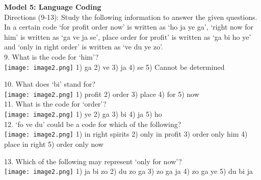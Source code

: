 \documentclass[
]{article}
\begin{document}
\textbf{Model 5: Language Coding}\\

Directions (9-13): Study the following information to answer the given questions.\\
In a certain code ‘for profit order now’ is written as ‘ho ja ye ga’, ‘right now for him’ is written as ‘ga ve ja se’, place order for profit’ is written as ‘ga bi ho ye’ and ‘only in right order’ is written as ‘ve du ye zo’.\\

9. What is the code for ‘him’?\\
\texttt{[image: image2.png]}
1) ga \hspace{2mm}2) ve \hspace{2mm}3) ja \hspace{2mm}4) se \hspace{2mm}5) Cannot be determined

10. What does ‘bi’ stand for?\\
\texttt{[image: image2.png]}
1) profit \hspace{2mm}2) order \hspace{2mm}3) place \hspace{2mm}4) for \hspace{2mm} 5) now\\

11. What is the code for ‘order’?\\
\texttt{[image: image2.png]}
1) ye \hspace{2mm}2) ga \hspace{2mm}3) bi \hspace{2mm}4) ja \hspace{2mm}5) ho\\

12. ‘fo ve du’ could be a code for which of the following?\\
\texttt{[image: image2.png]}
1) in right spirits \hspace{2mm}2) only in profit \hspace{2mm}3) order only him
\hspace{2mm}4) place in right \hspace{2mm} 5) order only now

13. Which of the following may represent ‘only for now’?\\
\texttt{[image: image2.png]}
1) ja bi zo \hspace{2mm} 2) du zo ga \hspace{2mm} 3) zo ga ja \hspace{2mm} 4) zo ga ye \hspace{2mm} 5) du bi ja\\
\end{document}
